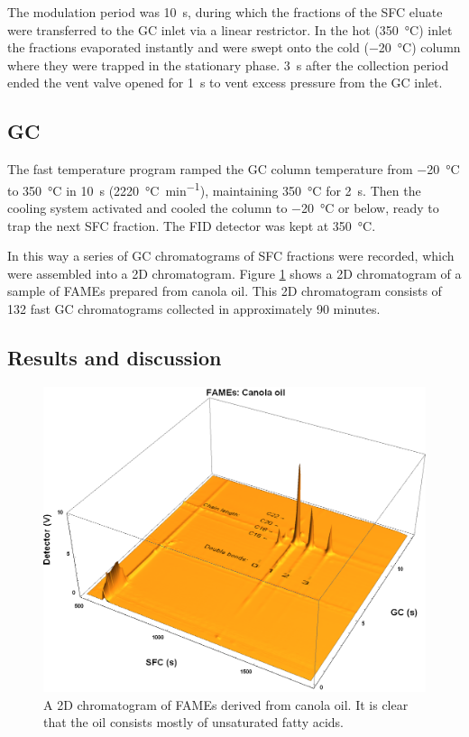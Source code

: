 The modulation period was \SI{10}{\second}, during which the fractions of the SFC
eluate were transferred to the GC inlet via a linear restrictor. In the hot
(\SI{350}{\celsius}) inlet the fractions evaporated instantly and were swept onto the
cold (\SI{-20}{\celsius}) column where they were trapped in the stationary phase.
\SI{3}{\second} after the collection period ended the vent valve opened for
\SI{1}{\second} to vent excess pressure from the GC inlet.

\subsection{GC}

The fast temperature program ramped the GC column temperature from
\SI{-20}{\celsius} to \SI{350}{\celsius} in \SI{10}{s}
(\SI{2220}{\celsius\per\minute}), maintaining \SI{350}{\celsius} for
\SI{2}{\second}. Then the cooling system activated and cooled the column to
\SI{-20}{\celsius} or below, ready to trap the next SFC fraction. The FID
detector was kept at \SI{350}{\celsius}.

In this way a series of GC chromatograms of SFC fractions were recorded, which
were assembled into a 2D chromatogram. Figure \ref{fig:2DCanola} shows a 2D
chromatogram of a sample of FAMEs prepared from canola oil. This 2D chromatogram
consists of 132 fast GC chromatograms collected in approximately 90 minutes.

\subsection{Results and discussion}

\begin{figure}
\centering
\includegraphics[width=\textwidth]{Figures/Canola.png}
\decoRule

\caption[SFC×GC of canola oil]{A 2D chromatogram of FAMEs derived from
canola oil. It is clear that the oil consists mostly of unsaturated fatty
acids.}

\label{fig:2DCanola}
\end{figure}

